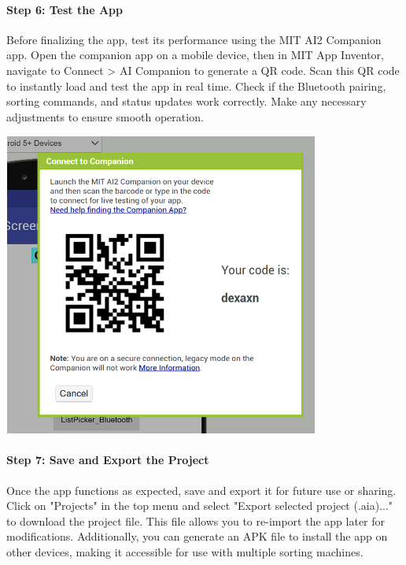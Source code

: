 \documentclass[conference, onecolumn]{IEEEtran}
\begin{document}
\paragraph{Step 6: Test the App} 
Before finalizing the app, test its performance using the MIT AI2 Companion app. Open the companion app on a mobile device, then in MIT App Inventor, navigate to Connect > AI Companion to generate a QR code. Scan this QR code to instantly load and test the app in real time. Check if the Bluetooth pairing, sorting commands, and status updates work correctly. Make any necessary adjustments to ensure smooth operation.
\begin{center}
    \includegraphics[height=10cm, width=0.7\linewidth]{QR Code.png}
    \label{fig1}
    \end{center}
      \vspace{3em}
\noindent


\paragraph{Step 7: Save and Export the Project}  
Once the app functions as expected, save and export it for future use or sharing. Click on "Projects" in the top menu and select "Export selected project (.aia)..." to download the project file. This file allows you to re-import the app later for modifications. Additionally, you can generate an APK file to install the app on other devices, making it accessible for use with multiple sorting machines.
\end{document}
